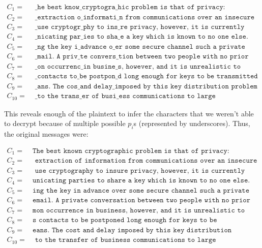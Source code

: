 \documentclass[11pt]{article}
\begin{document}
\begin{align*}
C_1=& \texttt{ \_he best know\_ cryptogra\_hic problem is that of privacy: preventing the unauthorized}\\
C_2=& \texttt{ \_extraction o\_ informati\_n from communications over an insecure channel. In order to}\\
C_3=& \texttt{ \_use cryptogr\_phy to ins\_re privacy, however, it is currently necessary for the comm}\\
C_4=& \texttt{ \_nicating par\_ies to sha\_e a key which is known to no one else. This is done by send}\\
C_5=& \texttt{ \_ng the key i\_ advance o\_er some secure channel such a private courier or registered}\\
C_6=& \texttt{ \_mail. A priv\_te convers\_tion between two people with no prior acquaintance is a com}\\
C_7=& \texttt{ \_on occurrenc\_ in busine\_s, however, and it is unrealistic to expect initial busines}\\
C_8=& \texttt{ \_ contacts to\_be postpon\_d long enough for keys to be transmitted by some physical m}\\
C_9=& \texttt{ \_ans. The cos\_ and delay\_imposed by this key distribution problem is a major barrier}\\
C_{10}=& \texttt{ \_to the trans\_er of busi\_ess communications to large teleprocessing networks.       }
\end{align*}

This reveals enough of the plaintext to infer the characters that we weren't able to decrypt because of multiple possible $p_i$s (represented by underscores). Thus, the original messages were:

\begin{align*}
C_1=& \texttt{The best known cryptographic problem is that of privacy: preventing the unauthorized}\\
C_2=& \texttt{ extraction of information from communications over an insecure channel. In order to}\\
C_3=& \texttt{ use cryptography to insure privacy, however, it is currently necessary for the comm}\\
C_4=& \texttt{unicating parties to share a key which is known to no one else. This is done by send}\\
C_5=& \texttt{ing the key in advance over some secure channel such a private courier or registered}\\
C_6=& \texttt{email. A private conversation between two people with no prior acquaintance is a com}\\
C_7=& \texttt{mon occurrence in business, however, and it is unrealistic to expect initial busines}\\
C_8=& \texttt{s contacts to be postponed long enough for keys to be transmitted by some physical m}\\
C_9=& \texttt{eans. The cost and delay imposed by this key distribution problem is a major barrier}\\
C_{10}=& \texttt{ to the transfer of business communications to large teleprocessing networks.       }
\end{align*}
\end{document}
